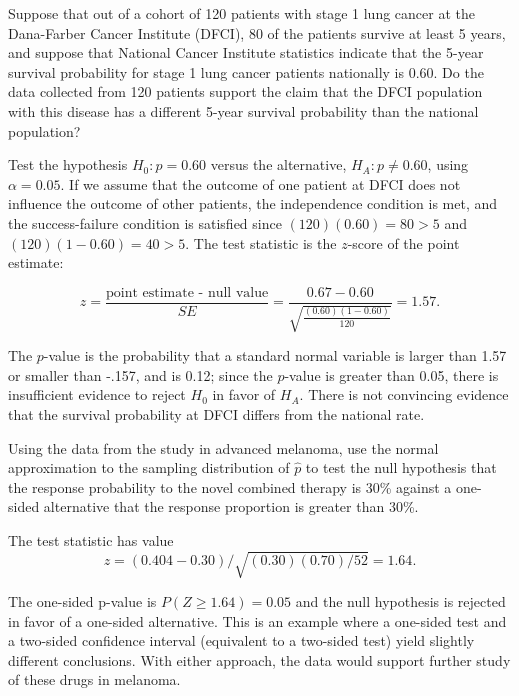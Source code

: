 \begin{example}{Suppose that out of a cohort of 120 patients with stage 1 lung cancer at the Dana-Farber Cancer Institute (DFCI), 80 of the patients survive at least 5 years, and suppose that National Cancer Institute statistics indicate that the 5-year survival probability for stage 1 lung cancer patients nationally is 0.60. Do the data collected from 120 patients support the claim that the DFCI population with this disease has a different 5-year survival probability than the national population?}

Test the hypothesis $H_0: p = 0.60$ versus the alternative, $H_A:  p \neq 0.60$, using $\alpha = 0.05$. If we assume that the outcome of one patient at DFCI does not influence the outcome of other patients, the independence condition is met, and the success-failure condition is satisfied since $(120)(0.60) = 80 > 5$ and $(120)(1-0.60) = 40 > 5.$ The test statistic is the $z$-score of the point estimate: 

\[z = \dfrac{\text{point estimate - null value}}{SE} = \dfrac{0.67 - 0.60}{\sqrt{\frac{(0.60)(1-0.60)}{120}}} = 1.57. \]

The $p$-value is the probability that a standard normal variable is larger than 1.57 or smaller than -.157, and is 0.12; since the $p$-value is greater than 0.05, there is insufficient evidence to reject $H_0$ in favor of $H_A$. There is not convincing evidence that the survival probability at DFCI differs from the national rate.

\end{example}

\begin{example} {Using the data from the study in advanced melanoma, use the normal approximation to the sampling distribution of $\hat{p}$ to test the null hypothesis that the response probability to the novel combined therapy is 30\% against a one-sided alternative that the response proportion is greater than 30\%.}

The test statistic has value 
\[
z = (0.404 - 0.30)/\sqrt{(0.30)(0.70)/52} = 1.64. 
\] 

The one-sided p-value is $P(Z \geq 1.64) = 0.05$ and the null hypothesis is rejected in favor of a one-sided alternative.  This is an example where a one-sided test and a two-sided confidence interval (equivalent to a two-sided test) yield slightly different conclusions. With either approach, the data would support further study of these drugs in melanoma.  

\end{example}

